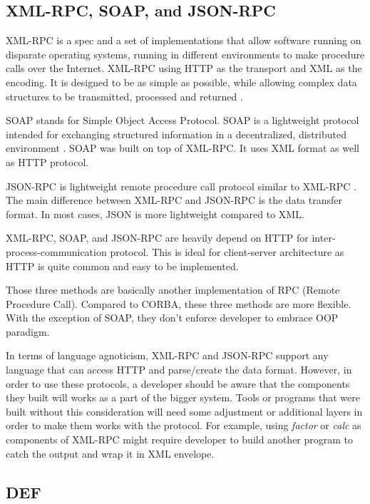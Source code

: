 \documentclass[conference]{IEEEtran}
\begin{document}
\subsection{XML-RPC, SOAP, and JSON-RPC}

XML-RPC is a spec and a set of implementations that allow software running on 
disparate operating systems, running in different environments to make procedure 
calls over the Internet. XML-RPC using HTTP as the transport and XML as the encoding.
It is designed to be as simple as possible, while allowing complex data structures to 
be transmitted, processed and returned \cite{xmlrpc}.

SOAP stands for Simple Object Access Protocol. SOAP is a lightweight protocol 
intended for exchanging structured information in a decentralized, distributed 
environment \cite{soap}. SOAP was built on top of XML-RPC. It uses XML format as 
well as HTTP protocol.

JSON-RPC is lightweight remote procedure call protocol similar to XML-RPC 
\cite{jsonrpc}. The main difference between XML-RPC and JSON-RPC is the data transfer
format. In most cases, JSON is more lightweight compared to XML.

XML-RPC, SOAP, and JSON-RPC are heavily depend on HTTP for inter-process-communication 
protocol. This is ideal for client-server architecture as HTTP is quite common and
easy to be implemented.

Those three methods are basically another implementation of RPC (Remote Procedure Call). 
Compared to CORBA, these three methods are more flexible. With the exception of SOAP,
they don't enforce developer to embrace OOP paradigm.

In terms of language agnoticism, XML-RPC and JSON-RPC support any language that can
access HTTP and parse/create the data format. However, in order to use these protocols,
a developer should be aware that the components they built will works as a part of the
bigger system. Tools or programs that were built without this consideration will need
some adjustment or additional layers in order to make them works with the protocol.
For example, using {\it{factor}} or {\it{calc}} as components of XML-RPC might require
developer to build another program to catch the output and wrap it in XML envelope.

\subsection{DEF}
\end{document}
